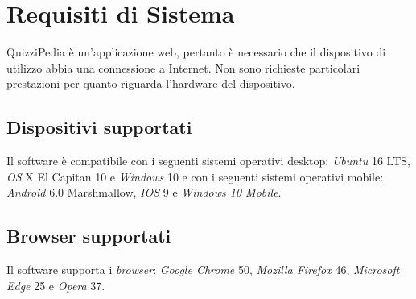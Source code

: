 \newpage
\section{Requisiti di Sistema}
QuizziPedia è un'applicazione web, pertanto è necessario che il dispositivo di utilizzo abbia una connessione a Internet. Non sono richieste particolari prestazioni per quanto riguarda l'hardware del dispositivo.
\subsection{Dispositivi supportati}
Il software \progetto{} è compatibile con i seguenti sistemi operativi desktop: \textit{Ubuntu} 16 LTS, \textit{OS} X El Capitan 10 e \textit{Windows} 10 e con i seguenti sistemi operativi mobile: \textit{Android} 6.0 Marshmallow, \textit{IOS} 9 e \textit{Windows 10 Mobile}.
\subsection{Browser supportati}
Il software \progetto{} supporta i \textit{browser}: \textit{Google Chrome} 50, \textit{Mozilla Firefox} 46, \textit{Microsoft Edge} 25 e \textit{Opera} 37.